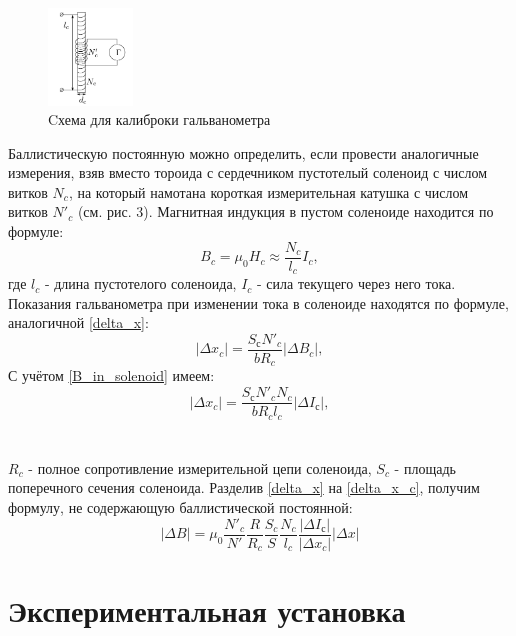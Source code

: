 \documentclass[14pt, a4paper,reqno]{article}
\begin{document}
    \begin{figure}
        \begin{center}
            \includegraphics[width = 0.2\textwidth]{images/picture_3.png}
        \end{center}
    \caption{Cхема для калиброки гальванометра}
    \end{figure}
    Баллистическую постоянную можно определить, если провести аналогичные измерения, взяв вместо тороида с сердечником пустотелый
    соленоид с числом витков $N_c$, на который намотана короткая измерительная катушка с числом витков $N'_c$ (см. рис. 3). Магнитная
    индукция в пустом соленоиде находится по формуле:
    \begin{equation}\label{B_in_solenoid}
        B_c = \mu_0 H_c \approx \frac{N_c}{l_c}I_c, 
    \end{equation}
    где $l_c$ - длина пустотелого соленоида, $I_c$ - сила текущего через него тока. Показания гальванометра при изменении тока в соленоиде 
    находятся по формуле, аналогичной
    \eqref{delta_x}:
    \begin{equation*}
        |\Delta x_c| = \frac{S_сN'_c}{bR_c}|\Delta B_c|,
    \end{equation*}
    С учётом \eqref{B_in_solenoid} имеем:
    \begin{equation}\label{delta_x_c}
        |\Delta x_c| = \frac{S_сN'_c N_c}{bR_c l_c}|\Delta I_с|,
    \end{equation}
    \\
    \\
     $R_c$ - полное сопротивление измерительной цепи соленоида, $S_c$ - площадь поперечного сечения соленоида. Разделив
    \eqref{delta_x} на \eqref{delta_x_c}, получим формулу, не содержающую баллистической постоянной:
    \begin{equation}\label{delta_B}
        \boxed{|\Delta B| = \mu_0 \frac{N'_c}{N'}\frac{R}{R_c}\frac{S_c}{S}\frac{N_c}{l_c}\frac{|\Delta I_с|}{|\Delta x_c|}|\Delta x|}
    \end{equation}

\section{Экспериментальная установка}
\end{document}
